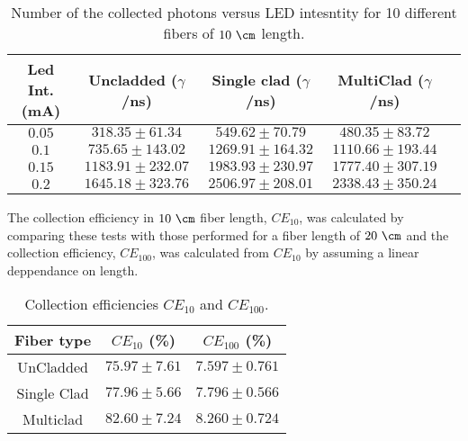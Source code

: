 \begin{table}[htbp]
\begin{center}
\begin{tabular}{|c|c|c|c|c|}
\hline
Led Int. (mA) & Uncladded ($\gamma$/ns) & Single clad ($\gamma$/ns) & MultiClad ($\gamma$/ns) \\
\hline \hline \hline
$0.05$ & $318.35 \pm 61.34$ & $549.62 \pm 70.79$ & $480.35 \pm 83.72$ \\ \hline
$0.1$ & $735.65 \pm 143.02$ & $1269.91 \pm 164.32$ & $1110.66 \pm 193.44$ \\ \hline
$0.15$ & $1183.91 \pm 232.07$ & $1983.93 \pm 230.97$ & $1777.40\pm 307.19$ \\ \hline
$0.2$ & $1645.18 \pm 323.76$ & $2506.97 \pm 208.01$ & $2338.43 \pm 350.24$ \\ \hline
\end{tabular}
\caption{Number of the collected photons versus LED intesntity for 10 different fibers of $10~\cm$ length.}
\label{tab:10DifferentSamplesAlltypes}
\end{center}
\end{table}




The collection efficiency in $10~\cm$ fiber length, $CE_{10}$, was calculated by comparing these tests with those performed for a fiber length of $20~\cm$ and the collection efficiency, $CE_{100}$, was calculated from $CE_{10}$ by assuming a linear deppendance on length.

\begin{table}[htbp]
\begin{center}
\begin{tabular}{|c|c|c|}
\hline
Fiber type & $CE_{10}$ (\%) & $CE_{100}$ (\%) \\\hline \hline \hline
UnCladded & $75.97 \pm 7.61$ & $7.597 \pm 0.761$ \\ \hline
Single Clad & $77.96 \pm 5.66$ & $7.796 \pm 0.566$ \\ \hline
Multiclad & $82.60 \pm 7.24$ & $8.260 \pm 0.724$ \\ \hline
\end{tabular}
\caption{Collection efficiencies $CE_{10}$ and $CE_{100}$.}
\label{tab:CollectionEfficiencyOfFibers}
\end{center}
\end{table}

